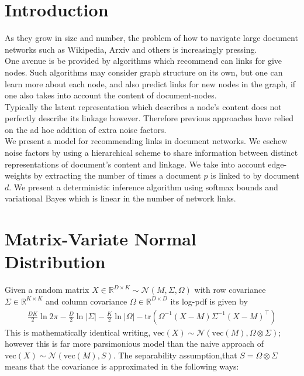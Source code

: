 \documentclass{sciposter}
\newcommand \vecf[1] {
    \text{vec}\left(#1\right)
}
\newcommand \halve[1] {
	\frac{#1}{2}
}
\newcommand \tr { \text{tr} }
\newcommand \T { ^\top }
\newcommand \nor[2]   { \mathcal{N} \left( {#1}, {#2} \right) }
\newcommand \mnor[3]  { \mathcal{N} \left(#1, #2, #3\right) }
\newcommand \Tr[1]   { \tr \left(  {#1}  \right) }
\newcommand \MReal[2] { { \mathbb{R}^{#1 \times #2} } }
\newcommand \inv[1] { {#1}^{-1} }
\begin{document}
\begin{multicols}{3}

\section{Introduction}
As they grow in size and number, the problem of how to navigate large document networks such as Wikipedia, Arxiv and others is increasingly pressing. \\

One avenue is be provided by algorithms which recommend can links for give nodes. Such algorithms may consider graph structure on its own\cite{Gopalan2013b}, but one can learn more about each node, and also predict links for new nodes in the graph, if one also takes into account the content of document-nodes. \\

Typically the latent representation which describes a node's content does not perfectly describe its linkage however. Therefore previous approaches have relied on the ad hoc addition of extra noise factors\cite{Chang2009a}\cite{Neiswanger2014}. \\

We present a model for recommending links in document networks. We eschew noise factors by using a hierarchical scheme to share information between distinct representations of document's content and linkage. We take into account edge-weights by extracting the number of times a document $p$ is linked to by document $d$. We present a deterministic inference algorithm using softmax bounds and variational Bayes which is linear in the number of network links.


\section{Matrix-Variate Normal Distribution}
Given a random matrix $X \in \MReal{D}{K} \sim \mnor{M}{\Sigma}{\Omega}$ with row covariance $\Sigma \in \MReal{K}{K}$ and column covariance $\Omega \in \MReal{D}{D}$ its log-pdf is given by
\begin{align*}
\halve{DK}\ln 2\pi - \halve{D}\ln|\Sigma| - \halve{K} \ln|\Omega| -\Tr{\inv{\Omega}(X - M)\inv{\Sigma}(X - M)\T}
\end{align*}
This is mathematically identical writing, $\vecf{X} \sim \nor{\vecf{M}}{\Omega \otimes \Sigma}$; however this is far more parsimonious model than the naive approach of $\vecf{X} \sim \nor{\vecf{M}}{S}$. The separability assumption,that $S = \Omega \otimes \Sigma$ means that the covariance is approximated in the following ways:


\end{multicols}
\end{document}
